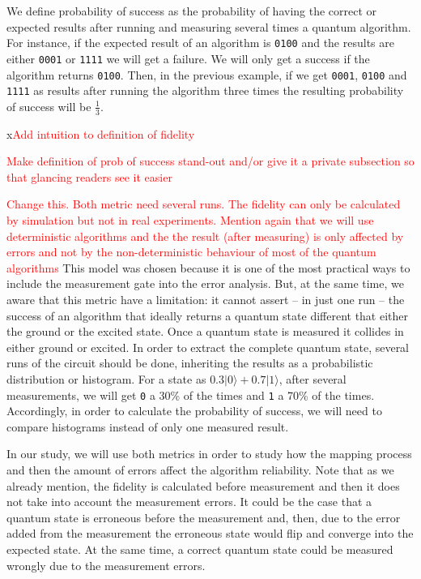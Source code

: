 We define probability of success as the probability of having the correct or expected results after running and measuring several times a quantum algorithm.
For instance, if the expected result of an algorithm is \texttt{0100} and the results are either \texttt{0001} or \texttt{1111} we will get a failure.
We will only get a success if the algorithm returns \texttt{0100}.
Then, in the previous example, if we get \texttt{0001}, \texttt{0100} and \texttt{1111} as results after running the algorithm three times the resulting probability of success will be \(\frac{1}{3}\).

x\textcolor{red}{Add intuition to definition of fidelity}

\textcolor{red}{Make definition of prob of success stand-out and/or give it a private subsection so that glancing readers see it easier}

\textcolor{red}{Change this. Both metric need several runs. The fidelity can only be calculated by simulation but not in real experiments. Mention again that we will use deterministic algorithms and the the result (after measuring) is only affected by errors and not by the non-deterministic behaviour of most of the quantum algorithms}
This model was chosen because it is one of the most practical ways to include the measurement gate into the error analysis.
But, at the same time, we aware that this metric have a limitation: it cannot assert -- in just one run -- the success of an algorithm that ideally returns a quantum state different that either the ground or the excited state.
Once a quantum state is measured it collides in either ground or excited.
In order to extract the complete quantum state, several runs of the circuit should be done, inheriting the results as a probabilistic distribution or histogram.
For a state as \(0.3 | 0 \rangle + 0.7 | 1 \rangle\), after several measurements, we will get \texttt{0} a 30\% of the times and \texttt{1} a 70\% of the times.
Accordingly, in order to calculate the probability of success, we will need to compare histograms instead of only one measured result.



In our study, we will use both metrics in order to study how the mapping process and then the amount of errors affect the  algorithm reliability.
Note that as we already mention, the fidelity is calculated before measurement and then it does  not take into account the measurement errors. It could be the case that a quantum state is erroneous before the measurement and, then, due to the error added from the measurement the erroneous state would flip and converge into the expected state.
At the same time, a correct quantum state could be measured wrongly due to the measurement errors.

